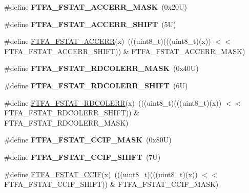 \begin{DoxyCompactItemize}
\item 
\mbox{\label{group___f_t_f_a___register___masks_gaf7824945e3224ae270302e23286e9e34}} 
\#define {\bfseries F\+T\+F\+A\+\_\+\+F\+S\+T\+A\+T\+\_\+\+A\+C\+C\+E\+R\+R\+\_\+\+M\+A\+SK}~(0x20\+U)
\item 
\mbox{\label{group___f_t_f_a___register___masks_ga3bbe94d5c4203cd6eebe9e0e78f555aa}} 
\#define {\bfseries F\+T\+F\+A\+\_\+\+F\+S\+T\+A\+T\+\_\+\+A\+C\+C\+E\+R\+R\+\_\+\+S\+H\+I\+FT}~(5\+U)
\item 
\#define \mbox{\hyperlink{group___f_t_f_a___register___masks_gad04a22e3da55d9f5d66b2c789ed3cfc7}{F\+T\+F\+A\+\_\+\+F\+S\+T\+A\+T\+\_\+\+A\+C\+C\+E\+RR}}(x)~(((uint8\+\_\+t)(((uint8\+\_\+t)(x)) $<$$<$ F\+T\+F\+A\+\_\+\+F\+S\+T\+A\+T\+\_\+\+A\+C\+C\+E\+R\+R\+\_\+\+S\+H\+I\+FT)) \& F\+T\+F\+A\+\_\+\+F\+S\+T\+A\+T\+\_\+\+A\+C\+C\+E\+R\+R\+\_\+\+M\+A\+SK)
\item 
\mbox{\label{group___f_t_f_a___register___masks_ga96b65895e79e6256e4312d5677dd8ae2}} 
\#define {\bfseries F\+T\+F\+A\+\_\+\+F\+S\+T\+A\+T\+\_\+\+R\+D\+C\+O\+L\+E\+R\+R\+\_\+\+M\+A\+SK}~(0x40\+U)
\item 
\mbox{\label{group___f_t_f_a___register___masks_ga4d4481b6c7d09a3bd6969cdf66a00d75}} 
\#define {\bfseries F\+T\+F\+A\+\_\+\+F\+S\+T\+A\+T\+\_\+\+R\+D\+C\+O\+L\+E\+R\+R\+\_\+\+S\+H\+I\+FT}~(6\+U)
\item 
\#define \mbox{\hyperlink{group___f_t_f_a___register___masks_ga30726583d59dcce5a14bd9aa97707e55}{F\+T\+F\+A\+\_\+\+F\+S\+T\+A\+T\+\_\+\+R\+D\+C\+O\+L\+E\+RR}}(x)~(((uint8\+\_\+t)(((uint8\+\_\+t)(x)) $<$$<$ F\+T\+F\+A\+\_\+\+F\+S\+T\+A\+T\+\_\+\+R\+D\+C\+O\+L\+E\+R\+R\+\_\+\+S\+H\+I\+FT)) \& F\+T\+F\+A\+\_\+\+F\+S\+T\+A\+T\+\_\+\+R\+D\+C\+O\+L\+E\+R\+R\+\_\+\+M\+A\+SK)
\item 
\mbox{\label{group___f_t_f_a___register___masks_ga7c3a9f7d0c5882721425d4c46b27a24d}} 
\#define {\bfseries F\+T\+F\+A\+\_\+\+F\+S\+T\+A\+T\+\_\+\+C\+C\+I\+F\+\_\+\+M\+A\+SK}~(0x80\+U)
\item 
\mbox{\label{group___f_t_f_a___register___masks_ga14a29b83c4f1b2e67a066799a46863f6}} 
\#define {\bfseries F\+T\+F\+A\+\_\+\+F\+S\+T\+A\+T\+\_\+\+C\+C\+I\+F\+\_\+\+S\+H\+I\+FT}~(7\+U)
\item 
\#define \mbox{\hyperlink{group___f_t_f_a___register___masks_ga2a11505d80dc52f6392743564adc0a50}{F\+T\+F\+A\+\_\+\+F\+S\+T\+A\+T\+\_\+\+C\+C\+IF}}(x)~(((uint8\+\_\+t)(((uint8\+\_\+t)(x)) $<$$<$ F\+T\+F\+A\+\_\+\+F\+S\+T\+A\+T\+\_\+\+C\+C\+I\+F\+\_\+\+S\+H\+I\+FT)) \& F\+T\+F\+A\+\_\+\+F\+S\+T\+A\+T\+\_\+\+C\+C\+I\+F\+\_\+\+M\+A\+SK)
\end{DoxyCompactItemize}
